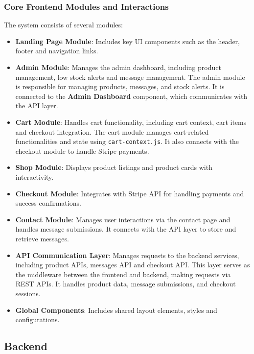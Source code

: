 \subsubsection{Core Frontend Modules and Interactions}
The system consists of several modules:
\begin{itemize}
    \item \textbf{Landing Page Module}: Includes key UI components such as the header, footer and navigation links.
    \item \textbf{Admin Module}: Manages the admin dashboard, including product management, low stock alerts and message management. The admin module is responsible for managing products, messages, and stock alerts. It is connected to the \textbf{Admin Dashboard} component, which communicates with the API layer.
    \item \textbf{Cart Module}: Handles cart functionality, including cart context, cart items and checkout integration. The cart module manages cart-related functionalities and state using \texttt{cart-context.js}. It also connects with the checkout module to handle Stripe payments.
    \item \textbf{Shop Module}: Displays product listings and product cards with interactivity.
    \item \textbf{Checkout Module}: Integrates with Stripe API for handling payments and success confirmations.
    \item \textbf{Contact Module}: Manages user interactions via the contact page and handles message submissions. It connects with the API layer to store and retrieve messages.
    \item \textbf{API Communication Layer}: Manages requests to the backend services, including product APIs, messages API and checkout API. This layer serves as the middleware between the frontend and backend, making requests via REST APIs. It handles product data, message submissions, and checkout sessions.
    \item \textbf{Global Components}: Includes shared layout elements, styles and configurations.
\end{itemize}



\subsection{Backend}
